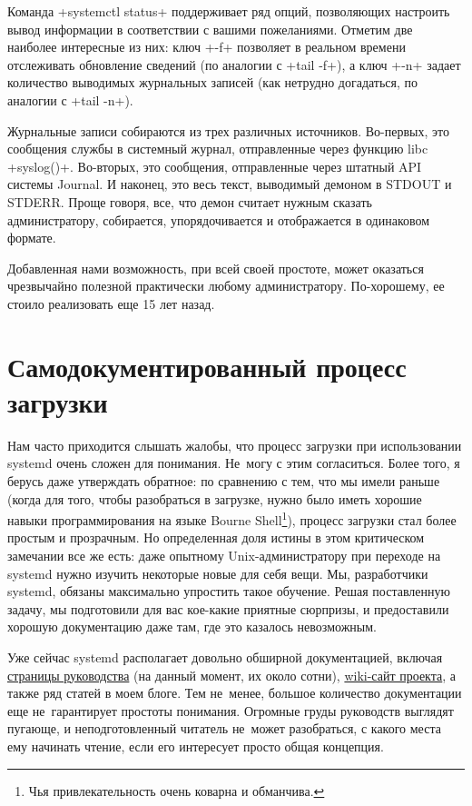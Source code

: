 \documentclass[10pt,oneside,a4paper]{article}
\begin{document}
Команда +systemctl status+ поддерживает ряд опций, позволяющих настроить вывод
информации в соответствии с вашими пожеланиями. Отметим две наиболее интересные
из них: ключ +-f+ позволяет в реальном времени отслеживать обновление сведений
(по аналогии с +tail -f+), а ключ +-n+ задает количество выводимых журнальных
записей (как нетрудно догадаться, по аналогии с +tail -n+).

Журнальные записи собираются из трех различных источников. Во-первых, это
сообщения службы в системный журнал, отправленные через функцию libc
+syslog()+. Во-вторых, это сообщения, отправленные через штатный API системы
Journal. И наконец, это весь текст, выводимый демоном в STDOUT и STDERR. Проще
говоря, все, что демон считает нужным сказать администратору, собирается,
упорядочивается и отображается в одинаковом формате.

Добавленная нами возможность, при всей своей простоте, может оказаться
чрезвычайно полезной практически любому администратору. По-хорошему, ее стоило
реализовать еще 15 лет назад.

\section{Самодокументированный процесс загрузки}

Нам часто приходится слышать жалобы, что процесс загрузки при использовании
systemd очень сложен для понимания. Не~могу с этим согласиться.  Более того, я
берусь даже утверждать обратное: по сравнению с тем, что мы имели раньше (когда
для того, чтобы разобраться в загрузке, нужно было иметь хорошие навыки
программирования на языке Bourne Shell\footnote{Чья привлекательность очень
коварна и обманчива.}), процесс загрузки стал более простым и прозрачным. Но
определенная доля истины в этом критическом замечании все же есть: даже опытному
Unix-администратору при переходе на systemd нужно изучить некоторые новые для
себя вещи. Мы, разработчики systemd, обязаны максимально упростить такое
обучение. Решая поставленную задачу, мы подготовили для вас кое-какие приятные
сюрпризы, и предоставили хорошую документацию даже там, где это казалось
невозможным.

Уже сейчас systemd располагает довольно обширной документацией, включая
\href{http://www.freedesktop.org/software/systemd/man/}{страницы руководства}
(на данный момент, их около сотни),
\href{http://www.freedesktop.org/wiki/Software/systemd}{wiki-сайт проекта}, а
также ряд статей в моем блоге. Тем не~менее, большое количество документации еще
не~гарантирует простоты понимания. Огромные груды руководств выглядят пугающе, и
неподготовленный читатель не~может разобраться, с какого места ему начинать
чтение, если его интересует просто общая концепция.
\end{document}
